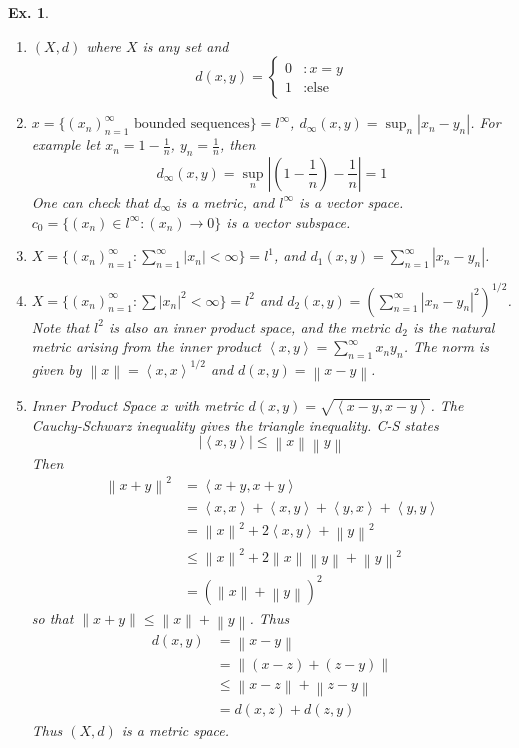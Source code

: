 \documentclass[12pt, a4paper]{book}
\newcommand{\inner}[2]{\left\langle #1, #2 \right\rangle} %
\newcommand{\norm}[1]{\left\lVert#1\right\rVert} %
\newtheorem{example}[theorem]{Ex.}
\theoremstyle{nonumberplain}
\begin{document}
\begin{example}
\begin{enumerate}
\begin{center}
            \end{center}
        \item $(X,d)$ where $X$ is any set and
            \[d(x,y)=
            \begin{cases}
                0&:x=y\\
                1&:\text{else}
            \end{cases}
            \]
        \item $x=\{(x_n)_{n=1}^\infty\text{ bounded sequences}\}=l^\infty$, $d_\infty(x,y)=\sup_n|x_n-y_n|$.
            For example let $x_n=1-\frac{1}{n}$, $y_n=\frac{1}{n}$, then
            \[d_\infty(x,y)=\sup_n\left|\left( 1-\frac{1}{n} \right)-\frac{1}{n}\right|=1\]
            One can check that $d_\infty$ is a metric, and $l^\infty$ is a vector space. $c_0=\{(x_n)\in l^\infty:(x_n)\to 0\}$
            is a vector subspace.
        \item $X=\{(x_n)_{n=1}^\infty:\sum\limits_{n=1}^\infty |x_n|<\infty\}=l^1$, and $d_1(x,y)=\sum\limits_{n=1}^\infty|x_n-y_n|$.
        \item $X=\{(x_n)_{n=1}^\infty:\sum|x_n|^2<\infty\}=l^2$ and $d_2(x,y)=\left(\sum\limits_{n=1}^\infty|x_n-y_n|^2\right)^{1/2}$.
            Note that $l^2$ is also an inner product space, and the metric $d_2$ is the natural metric arising from the inner
            product $\inner{x}{y}=\sum\limits_{n=1}^\infty x_ny_n$. The norm is given by $\norm{x}=\inner{x}{x}^{1/2}$
            and $d(x,y)=\norm{x-y}$.
        \item Inner Product Space $x$ with metric $d(x,y)=\sqrt{\inner{x-y}{x-y}}$. The Cauchy-Schwarz inequality gives
            the triangle inequality. C-S states
            \[|\inner{x}{y}|\leq\norm{x}\norm{y}\]
            Then
            \begin{align*}
                \norm{x+y}^2&=\inner{x+y}{x+y}\\
                &=\inner{x}{x}+\inner{x}{y}+\inner{y}{x}+\inner{y}{y}\\
                &=\norm{x}^2+2\inner{x}{y}+\norm{y}^2\\
                &\leq\norm{x}^2+2\norm{x}\norm{y}+\norm{y}^2\\
                &=(\norm{x}+\norm{y})^2
            \end{align*}
            so that $\norm{x+y}\leq\norm{x}+\norm{y}$. Thus
            \begin{align*}
                d(x,y)&=\norm{x-y}\\
                &=\norm{(x-z)+(z-y)}\\
                &\leq\norm{x-z}+\norm{z-y}\\
                &=d(x,z)+d(z,y)
            \end{align*}
            Thus $(X,d)$ is a metric space.
    \end{enumerate}
\end{example}
\end{document}
